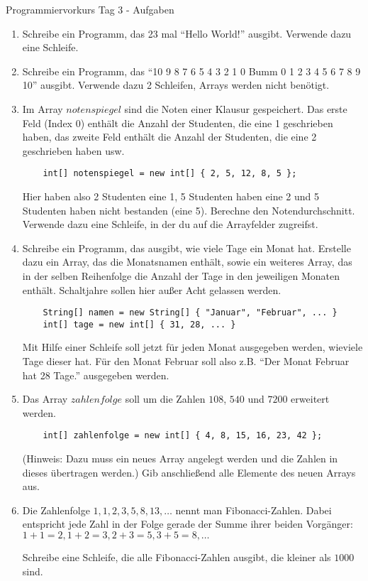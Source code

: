 \documentclass[final,a4paper]{article}
\begin{document}
\lstset{tabsize=4}
\lstset{basicstyle=\small}
\lstset{language=java}

{\huge Programmiervorkurs Tag 3 - Aufgaben}

\bigskip

\begin{enumerate}
  \item{
	Schreibe ein Programm, das 23 mal "`Hello World!"' ausgibt. Verwende dazu eine Schleife.
	}
  \item{
	Schreibe ein Programm, das "`10 9 8 7 6 5 4 3 2 1 0 Bumm 0 1 2 3 4 5 6 7 8 9 10"' ausgibt.
	Verwende dazu 2 Schleifen, Arrays werden nicht benötigt.
	}
  \item{
	Im Array $notenspiegel$ sind die Noten einer Klausur gespeichert. Das erste Feld (Index $0$)
	enthält die Anzahl der Studenten, die eine 1 geschrieben haben, das zweite Feld enthält
	die Anzahl der Studenten, die eine 2 geschrieben haben usw.
	\begin{lstlisting}
	int[] notenspiegel = new int[] { 2, 5, 12, 8, 5 };
	\end{lstlisting}
	Hier haben also 2 Studenten eine 1, 5 Studenten haben eine 2 und 5 Studenten haben nicht bestanden (eine 5).
	Berechne den Notendurchschnitt. Verwende dazu eine Schleife, in der du auf die Arrayfelder zugreifst.
	}
  \item{
	Schreibe ein Programm, das ausgibt, wie viele Tage ein Monat hat. Erstelle dazu ein Array,
	das die Monatsnamen enthält, sowie ein weiteres Array, das in der selben Reihenfolge die Anzahl
	der Tage in den jeweiligen Monaten enthält. Schaltjahre sollen hier außer Acht gelassen werden.
	\begin{lstlisting}
	String[] namen = new String[] { "Januar", "Februar", ... }
	int[] tage = new int[] { 31, 28, ... }
	\end{lstlisting}
	Mit Hilfe einer Schleife soll jetzt für jeden Monat ausgegeben werden, wieviele Tage dieser hat.
	Für den Monat Februar soll also z.B. "`Der Monat Februar hat 28 Tage."' ausgegeben werden.
	}
  \item{
	Das Array $zahlenfolge$ soll um die Zahlen $108$, $540$ und $7200$ erweitert werden.
	\begin{lstlisting}
	int[] zahlenfolge = new int[] { 4, 8, 15, 16, 23, 42 };
	\end{lstlisting}
	(Hinweis: Dazu muss ein neues Array angelegt werden und die Zahlen in dieses übertragen werden.)
	Gib anschließend alle Elemente des neuen Arrays aus.
	}
  \item{
	Die Zahlenfolge $1, 1, 2, 3, 5, 8, 13, \ldots$ nennt man Fibonacci-Zahlen. Dabei entspricht jede Zahl
	in der Folge gerade der Summe ihrer beiden Vorgänger: $1+1=2, 1+2=3, 2+3=5, 3+5=8, \ldots$

	Schreibe eine Schleife, die alle Fibonacci-Zahlen ausgibt, die kleiner als $1000$ sind.
	}
\end{enumerate}
\end{document}
